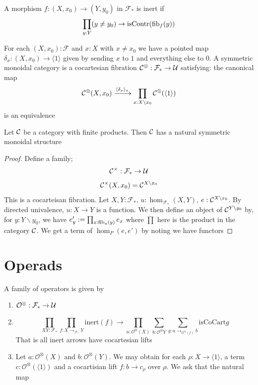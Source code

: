\documentclass{article}
\newcommand{\Oc}{\mathcal{O}^\otimes}
\newcommand{\cF}{\mathcal{F}}
\begin{document}
\begin{definition}
  A morphism $f : (X, x_0) \to (Y, y_0)$ in $\cF_\ast$ is inert if 
  \[ \prod_{y : Y} (y \neq y_0) \to \operatorname{isContr}( \operatorname{fib}_f(y) ) \]
\end{definition}

\begin{definition}
  For each $(X, x_0) : \cF$ and $x : X$ with $x \neq x_0$ we have a pointed map $\delta_x : (X, x_0) \to \langle 1 \rangle$ given by sending $x$ to $1$ and everything else to $0$.
  A symmetric monoidal category is a cocartesian fibration $\cC^\otimes : \cF_\ast \to \UU$ satisfying:
  the canonical map
  \[  \mathcal{C}^\otimes(X, x_0) \xrightarrow{\langle \delta_x \rangle_x} \prod_{x: X \backslash x_0} \mathcal{C}^\otimes(\langle 1 \rangle)\] 
  is an equivalence
\end{definition}

\begin{example}
  Let $\mathcal{C}$ be a category with finite products. Then $\mathcal{C}$ has a natural symmetric monoidal structure 
\end{example}
\begin{proof}
  Define a family;
   \[ \cC^\times : \cF_\ast \to \UU \]
   \[ \mathcal{C}^\times(X, x_0) = \mathcal{C}^{X \backslash x_0}  \]
  This is a cocarteisan fibration. 
  Let $X, Y : \cF_\ast$, $u : \hom_{\cF_\ast}(X, Y)$, $e : \mathcal{C}^{X \backslash x_0}$. 
  By directed univalence, $u : X \to Y$ is a function. We then define an object of $\mathcal{C}^{Y \backslash y_0}$ by, for $y : Y \backslash y_0$, we have $e'_y := \prod_{x : \operatorname{fib}_u(y)} e_x$ where $\prod$ here is the product in the category $\mathcal{C}$.
  We get a term of $\hom_P(e, e')$ by noting we have functors 
\end{proof}



\section{Operads}


\begin{definition}
  A family of operators is given by 
  \begin{enumerate}
    \item $ \mathcal{O}^\otimes : \cF_\ast \to \UU $
    \item \[\prod_{X Y :\cF_\ast } 
            \prod_{f : X \to_{\cF_\ast} Y} 
            \mathrm{inert}(f) \to 
            \prod_{a : \Oc(X)} 
            \sum_{b : \Oc{Y}} 
            \sum_{g : a \to_{\Oc(f)} b}
            \mathrm{isCoCart} g \]
          That is all inert arrows have cocartesian lifts
    \item Let $a : \Oc(X)$ and $b : \Oc(Y)$. 
          We may obtain for each $\rho : X \to \langle 1 \rangle$, a term $c : \Oc(\langle 1 \rangle)$ and a cocartisian lift $f : b \to c_\rho$ over $\rho$.
          We ask that the natural map 
          \[ \]
  \end{enumerate}
\end{definition}
\end{document}
